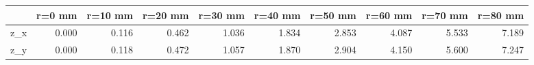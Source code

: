 \documentclass[convert={convertexe={magick.exe}}]{standalone}
\begin{document}
\begin{tabular}{lrrrrrrrrr}
\toprule
{} &  r=0 mm &  r=10 mm &  r=20 mm &  r=30 mm &  r=40 mm &  r=50 mm &  r=60 mm &  r=70 mm &  r=80 mm \\
\midrule
z\_x &   0.000 &    0.116 &    0.462 &    1.036 &    1.834 &    2.853 &    4.087 &    5.533 &    7.189 \\
z\_y &   0.000 &    0.118 &    0.472 &    1.057 &    1.870 &    2.904 &    4.150 &    5.600 &    7.247 \\
\bottomrule
\end{tabular}
\end{document}
